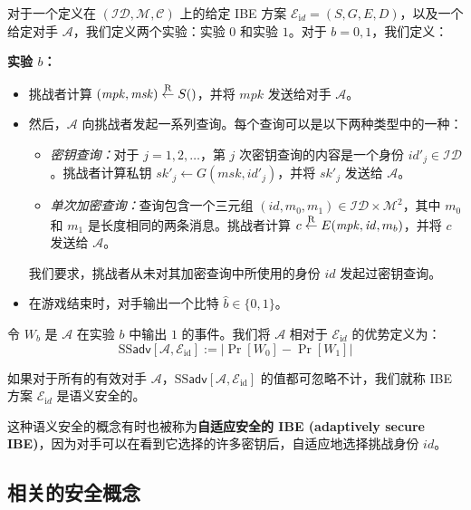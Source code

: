 \begin{game}[语义安全性]\label{game:15-4}
对于一个定义在 $(\mathcal{ID},\mathcal{M},\mathcal{C})$ 上的给定 IBE 方案 $\mathcal{E}_{\mathrm{i}d}=(S,G,E,D)$，以及一个给定对手 $\mathcal{A}$，我们定义两个实验：实验 $0$ 和实验 $1$。对于 $b=0,1$，我们定义：

\vspace{5pt}

\noindent\textbf{实验 $b$：}
\begin{itemize}
	\item 挑战者计算 $(\mathit{mpk},\mathit{msk})\overset{\rm R}\leftarrow S()$，并将 $\mathit{mpk}$ 发送给对手 $\mathcal{A}$。
	\item 然后，$\mathcal{A}$ 向挑战者发起一系列查询。每个查询可以是以下两种类型中的一种：
	\begin{itemize}
		\item \emph{密钥查询：}对于 $j=1,2,\dots$，第 $j$ 次密钥查询的内容是一个身份 $\mathit{id'}_j\in\mathcal{ID}$。挑战者计算私钥 $\mathit{sk'}_j\leftarrow G(\mathit{msk},\mathit{id'}_j)$，并将 $\mathit{sk'}_j$ 发送给 $\mathcal{A}$。
		\item \emph{单次加密查询：}查询包含一个三元组 $(\mathit{id},m_0,m_1)\in\mathcal{ID}\times\mathcal{M}^2$，其中 $m_0$ 和 $m_1$ 是长度相同的两条消息。挑战者计算 $c\overset{\rm R}\leftarrow E(\mathit{mpk},\mathit{id},m_b)$，并将 $c$ 发送给 $\mathcal{A}$。
	\end{itemize}
	我们要求，挑战者从未对其加密查询中所使用的身份 $\mathit{id}$ 发起过密钥查询。
	\item 在游戏结束时，对手输出一个比特 $\hat{b}\in\{0,1\}$。
\end{itemize}
令 $W_b$ 是 $\mathcal{A}$ 在实验 $b$ 中输出 $1$ 的事件。我们将 $\mathcal{A}$ 相对于 $\mathcal{E}_{\mathrm{i}d}$ 的优势定义为：
\[
\mathrm{SS}\mathsf{adv}[\mathcal{A},\mathcal{E}_\mathrm{id}]:=
\big\lvert
\Pr[W_0]-\Pr[W_1]
\big\rvert
\]
\end{game}

\begin{definition}\label{def:15-8}
如果对于所有的有效对手 $\mathcal{A}$，$\mathrm{SS}\mathsf{adv}[\mathcal{A},\mathcal{E}_\mathrm{id}]$ 的值都可忽略不计，我们就称 IBE 方案 $\mathcal{E}_{\mathrm{i}d}$ 是语义安全的。
\end{definition}

这种语义安全的概念有时也被称为\textbf{自适应安全的 IBE (adaptively secure IBE)}，因为对手可以在看到它选择的许多密钥后，自适应地选择挑战身份 $\mathit{id}$。

\subsection{相关的安全概念}\label{subsec:15-6-2}


